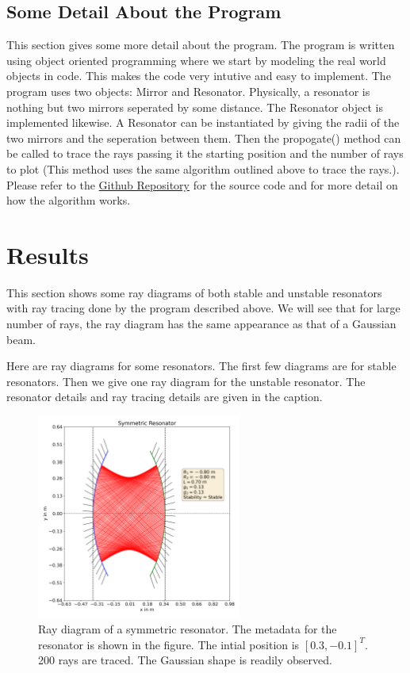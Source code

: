 \documentclass[12pt]{article}
\begin{document}
\subsection{Some Detail About the Program}
This section gives some more detail about the program. The program is written using {\color{cyan} object oriented programming} where we start by modeling the real world objects in code. This makes the code very intutive and easy to implement. The program uses two objects: {\color{cyan} Mirror} and {\color{cyan} Resonator}. Physically, a resonator is nothing but two mirrors seperated by some distance. The {\color{cyan} Resonator} object is implemented likewise. A {\color{cyan} Resonator} can be instantiated by giving the radii of the two mirrors and the seperation between them. Then the {\color{cyan} propogate()}  method can be called to trace the rays passing it the starting position and the number of rays to plot (This method uses the same algorithm outlined above to trace the rays.). Please refer to the \href{https://github.com/Hari31416/Laser-Term-Paper}{Github Repository} for the source code and for more detail on how the algorithm works.

\section{Results}
This section shows some ray diagrams of both stable and unstable resonators with ray tracing done by the program described above. We will see that for large number of rays, the ray diagram has the same appearance as that of a Gaussian beam.

Here are ray diagrams for some resonators. The first few diagrams are for stable resonators. Then we give one ray diagram for the unstable resonator. The resonator details and ray tracing details are given in the caption.
\begin{figure}[h]
    \centering
    \includegraphics[width=0.6\textwidth]{images/symmetric.png}
    \caption{Ray diagram of a symmetric resonator. The metadata for the resonator is shown in the figure. The intial position is \([0.3, -0.1]^T\). 200 rays are traced. The Gaussian shape is readily observed.}
    \label{fig:symmetric}
\end{figure}
\end{document}
